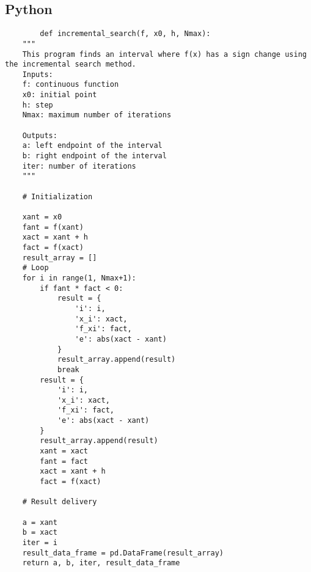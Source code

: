 \documentclass{article}
\begin{document}
    \subsection{Python}
    \begin{verbatim}
        def incremental_search(f, x0, h, Nmax):
    """
    This program finds an interval where f(x) has a sign change using the incremental search method.
    Inputs:
    f: continuous function
    x0: initial point
    h: step
    Nmax: maximum number of iterations

    Outputs:
    a: left endpoint of the interval
    b: right endpoint of the interval
    iter: number of iterations
    """

    # Initialization

    xant = x0
    fant = f(xant)
    xact = xant + h
    fact = f(xact)
    result_array = []
    # Loop
    for i in range(1, Nmax+1):
        if fant * fact < 0:
            result = {
                'i': i,
                'x_i': xact,
                'f_xi': fact,
                'e': abs(xact - xant)
            }
            result_array.append(result)
            break
        result = {
            'i': i,
            'x_i': xact,
            'f_xi': fact,
            'e': abs(xact - xant)
        }
        result_array.append(result)
        xant = xact
        fant = fact
        xact = xant + h
        fact = f(xact)

    # Result delivery

    a = xant
    b = xact
    iter = i
    result_data_frame = pd.DataFrame(result_array)
    return a, b, iter, result_data_frame
        \end{verbatim}
\end{document}
